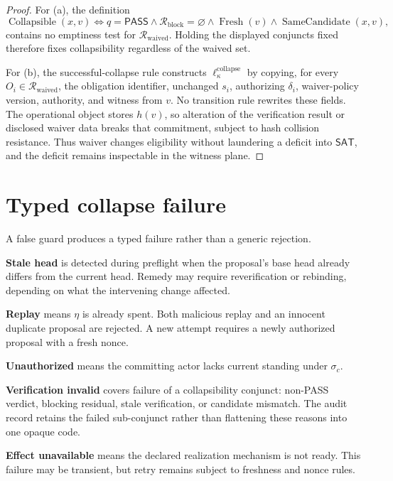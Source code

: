 \documentclass[11pt,openany]{book}
\newcommand{\Pass}{\mathsf{PASS}}
\begin{document}
\begin{proof}
For (a), the definition
\[
 \operatorname{Collapsible}(x,v)
 \Longleftrightarrow
 q=\Pass\land\mathcal R_{\mathrm{block}}=\varnothing
 \land\operatorname{Fresh}(v)
 \land\operatorname{SameCandidate}(x,v),
\]
contains no emptiness test for \(\mathcal R_{\mathrm{waived}}\). Holding the
displayed conjuncts fixed therefore fixes collapsibility regardless of the
waived set.

For (b), the successful-collapse rule constructs
\(\ell^{\mathrm{collapse}}_\kappa\) by copying, for every
\(O_i\in\mathcal R_{\mathrm{waived}}\), the obligation identifier, unchanged
\(s_i\), authorizing \(\delta_i\), waiver-policy version, authority, and witness
from \(v\). No transition rule rewrites these fields. The operational object
stores \(h(v)\), so alteration of the verification result or disclosed waiver
data breaks that commitment, subject to hash collision resistance. Thus waiver
changes eligibility without laundering a deficit into \(\mathsf{SAT}\), and
the deficit remains inspectable in the witness plane.
\end{proof}

\section{Typed collapse failure}

A false guard produces a typed failure rather than a generic rejection.

\textbf{Stale head} is detected during preflight when the proposal's base head
already differs from the current head. Remedy may require reverification or
rebinding, depending on what the intervening change affected.

\textbf{Replay} means \(\eta\) is already spent. Both malicious replay and an
innocent duplicate proposal are rejected. A new attempt requires a newly
authorized proposal with a fresh nonce.

\textbf{Unauthorized} means the committing actor lacks current standing under
\(\sigma_c\).

\textbf{Verification invalid} covers failure of a collapsibility conjunct:
non-PASS verdict, blocking residual, stale verification, or candidate mismatch.
The audit record retains the failed sub-conjunct rather than flattening these
reasons into one opaque code.

\textbf{Effect unavailable} means the declared realization mechanism is not
ready. This failure may be transient, but retry remains subject to freshness
and nonce rules.
\end{document}
